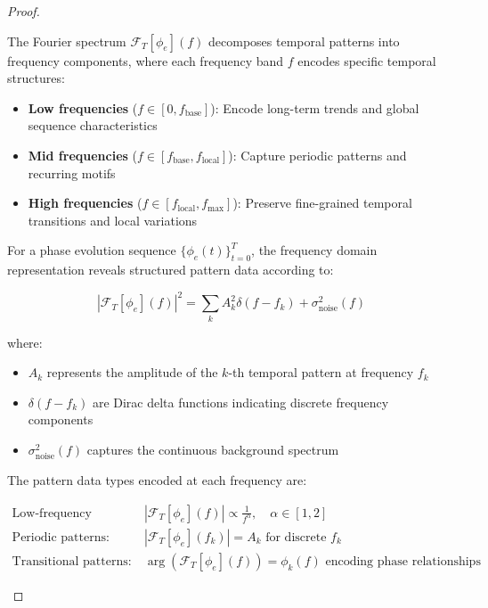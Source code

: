 \begin{proof}
\begin{definition}
The Fourier spectrum $\mathcal{F}_T[\phi_e](f)$ decomposes temporal patterns into frequency components, where each frequency band $f$ encodes specific temporal structures:

\begin{itemize}
    \item \textbf{Low frequencies} ($f \in [0, f_{\text{base}}]$): Encode long-term trends and global sequence characteristics
    \item \textbf{Mid frequencies} ($f \in [f_{\text{base}}, f_{\text{local}}]$): Capture periodic patterns and recurring motifs
    \item \textbf{High frequencies} ($f \in [f_{\text{local}}, f_{\text{max}}]$): Preserve fine-grained temporal transitions and local variations
\end{itemize}
\end{definition}

\begin{theorem}
For a phase evolution sequence $\{\phi_e(t)\}_{t=0}^T$, the frequency domain representation reveals structured pattern data according to:

\begin{equation}
|\mathcal{F}_T[\phi_e](f)|^2 = \sum_{k} A_k^2 \delta(f - f_k) + \sigma_{\text{noise}}^2(f)
\end{equation}

where:
\begin{itemize}
    \item $A_k$ represents the amplitude of the $k$-th temporal pattern at frequency $f_k$
    \item $\delta(f - f_k)$ are Dirac delta functions indicating discrete frequency components
    \item $\sigma_{\text{noise}}^2(f)$ captures the continuous background spectrum
\end{itemize}

The pattern data types encoded at each frequency are:

\begin{align}
\text{Low-frequency patterns:} \quad &|\mathcal{F}_T[\phi_e](f)| \propto \frac{1}{f^\alpha}, \quad \alpha \in [1,2] \\
\text{Periodic patterns:} \quad &|\mathcal{F}_T[\phi_e](f_k)| = A_k \text{ for discrete } f_k \\
\text{Transitional patterns:} \quad &\arg(\mathcal{F}_T[\phi_e](f)) = \phi_k(f) \text{ encoding phase relationships}
\end{align}
\end{theorem}


\end{proof}
